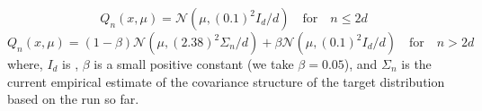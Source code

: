         $$Q_n(x, \mu)=\mathcal{N}(\mu,{(0.1)}^2I_d/d)\quad \text{for} \quad n\le2d$$
        $$Q_n(x, \mu)=(1-\beta)\mathcal{N}(\mu,{(2.38)}^2\Sigma_n/d) + \beta\mathcal{N}(\mu,{(0.1)}^2I_d/d)\quad \text{for} \quad n>2d$$
        where, $I_d$ is , $\beta$ is a small positive constant (we take $\beta=0.05$), and $\Sigma_n$ is the current empirical estimate of the covariance structure of the target distribution based on the run so far.
        

        










